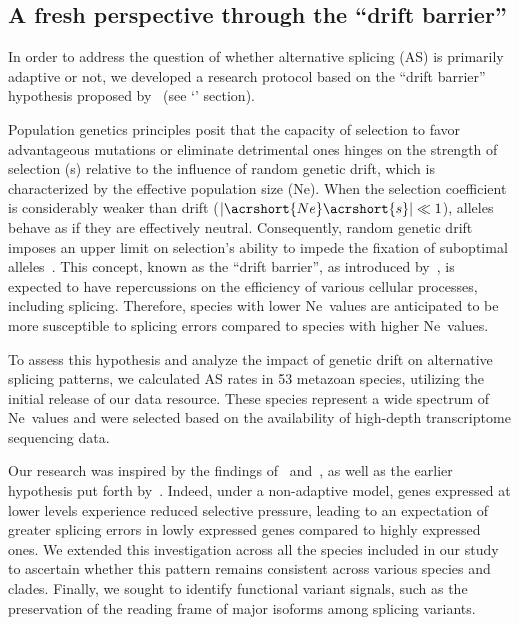 \subsection{A fresh perspective through the “drift barrier”}

In order to address the question of whether alternative splicing (\acrshort{AS}) is primarily adaptive or not, we developed a research protocol based on the “drift barrier” hypothesis proposed by~\citet{lynch_frailty_2007} (see `' section).

Population genetics principles posit that the capacity of selection to favor advantageous mutations or eliminate detrimental ones hinges on the strength of selection (\acrshort{s}) relative to the influence of random genetic drift, which is characterized by the effective population size (\acrshort{Ne}). When the selection coefficient is considerably weaker than drift ($|\acrshort{Ne}\acrshort{s}| \ll 1 $), \gls{allele}s behave as if they are effectively neutral. Consequently, random genetic drift imposes an upper limit on selection's ability to impede the fixation of suboptimal \gls{allele}s~\citep{kimura_mutation_1963, ohta_slightly_1973}. This concept, known as the “drift barrier”, as introduced by~\citet{lynch_frailty_2007}, is expected to have repercussions on the efficiency of various cellular processes, including splicing. Therefore, species with lower \acrshort{Ne}~values are anticipated to be more susceptible to splicing errors compared to species with higher \acrshort{Ne}~values.

To assess this hypothesis and analyze the impact of genetic drift on alternative splicing patterns, we calculated \acrshort{AS} rates in 53 metazoan species, utilizing the initial release of our data resource. These species represent a wide spectrum of \acrshort{Ne}~values and were selected based on the availability of high-depth transcriptome sequencing data.

Our research was inspired by the findings of~\citet{braunschweig_widespread_2014} and~\citet{saudemont_fitness_2017}, as well as the earlier hypothesis put forth by~\citet{chen_correcting_2014}. Indeed, under a non-adaptive model, genes expressed at lower levels experience reduced selective pressure, leading to an expectation of greater splicing errors in lowly expressed genes compared to highly expressed ones. We extended this investigation across all the species included in our study to ascertain whether this pattern remains consistent across various species and clades. Finally, we sought to identify functional variant signals, such as the preservation of the reading frame of major isoforms among splicing variants.


